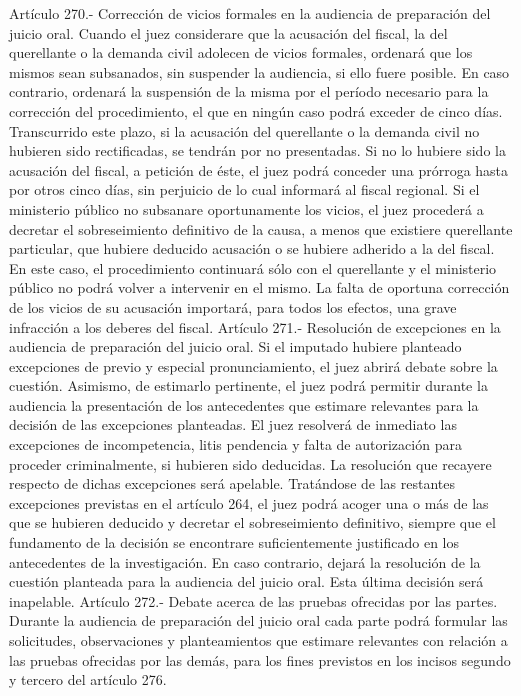     Artículo 270.- Corrección de vicios formales en la audiencia de preparación del juicio oral. Cuando el juez considerare que la acusación del fiscal, la del querellante o la demanda civil adolecen de vicios formales, ordenará que los mismos sean subsanados, sin suspender la audiencia, si ello fuere posible.
    En caso contrario, ordenará la suspensión de la misma por el período necesario para la corrección del procedimiento, el que en ningún caso podrá exceder de cinco días. Transcurrido este plazo, si la acusación del querellante o la demanda civil no hubieren sido rectificadas, se tendrán por no presentadas. Si no lo hubiere sido la acusación del fiscal, a petición de éste, el juez podrá conceder una prórroga hasta por otros cinco días, sin perjuicio de lo cual informará al fiscal regional.
    Si el ministerio público no subsanare oportunamente los vicios, el juez procederá a decretar el sobreseimiento definitivo de la causa, a menos que existiere querellante particular, que hubiere deducido acusación o se hubiere adherido a la del fiscal. En este caso, el procedimiento continuará sólo con el querellante y el ministerio público no podrá volver a intervenir en el mismo.
    La falta de oportuna corrección de los vicios de su acusación importará, para todos los efectos, una grave infracción a los deberes del fiscal.
    Artículo 271.- Resolución de excepciones en la audiencia de preparación del juicio oral. Si el imputado hubiere planteado excepciones de previo y especial pronunciamiento, el juez abrirá debate sobre la cuestión. Asimismo, de estimarlo pertinente, el juez podrá permitir durante la audiencia la presentación de los antecedentes que estimare relevantes para la decisión de las excepciones planteadas.
    El juez resolverá de inmediato las excepciones de incompetencia, litis pendencia y falta de autorización para proceder criminalmente, si hubieren sido deducidas. La resolución que recayere respecto de dichas excepciones será apelable.
    Tratándose de las restantes excepciones previstas en el artículo 264, el juez podrá acoger una o más de las que se hubieren deducido y decretar el sobreseimiento definitivo, siempre que el fundamento de la decisión se encontrare suficientemente justificado en los antecedentes de la investigación. En caso contrario, dejará la resolución de la cuestión planteada para la audiencia del juicio oral. Esta última decisión será inapelable.
    Artículo 272.- Debate acerca de las pruebas ofrecidas por las partes. Durante la audiencia de preparación del juicio oral cada parte podrá formular las solicitudes, observaciones y planteamientos que estimare relevantes con relación a las pruebas ofrecidas por las demás, para los fines previstos en los incisos segundo y tercero del artículo 276.
